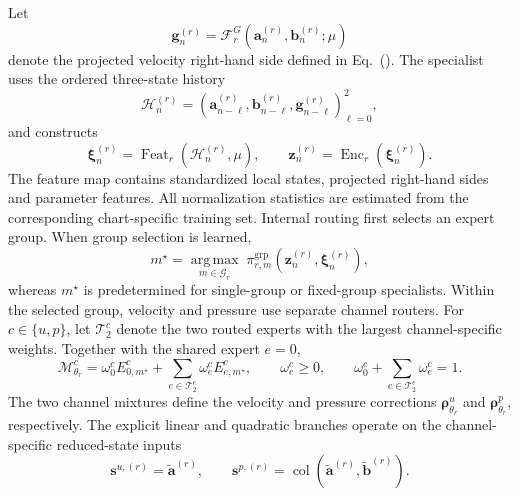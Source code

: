 Let
\begin{equation}
  \bm g_n^{(r)}
  =
  \mathcal F_r^G
  \left(
    \bm a_n^{(r)},\bm b_n^{(r)};\mu
  \right)
  \label{eq:app_galerkin_feature}
\end{equation}
denote the projected velocity right-hand side defined in Eq.~(). The specialist uses the ordered three-state history
\begin{equation}
  \mathcal H_n^{(r)}
  =
  \left(
    \bm a_{n-\ell}^{(r)},
    \bm b_{n-\ell}^{(r)},
    \bm g_{n-\ell}^{(r)}
  \right)_{\ell=0}^{2},
  \label{eq:app_specialist_history}
\end{equation}
and constructs
\begin{equation}
  \bm\xi_n^{(r)}
  =
  \operatorname{Feat}_r
  \left(
    \mathcal H_n^{(r)},\mu
  \right),
  \qquad
  \bm z_n^{(r)}
  =
  \operatorname{Enc}_r
  \left(
    \bm\xi_n^{(r)}
  \right).
  \label{eq:app_specialist_features}
\end{equation}
The feature map contains standardized local states, projected
right-hand sides and parameter features. All normalization statistics are estimated from the corresponding chart-specific training set. Internal routing first selects an expert group. When group selection is learned,
\begin{equation}
  m^\star
  =
  \underset{m\in\mathcal G_r}{\operatorname{arg\,max}}
  \;
  \pi_{r,m}^{\mathrm{grp}}
  \left(
    \bm z_n^{(r)},\bm\xi_n^{(r)}
  \right),
  \label{eq:app_group_top1}
\end{equation}
whereas $m^\star$ is predetermined for single-group or fixed-group
specialists. Within the selected group, velocity and pressure use separate channel routers. For $c\in\{u,p\}$, let $\mathcal T_2^c$ denote the two routed experts with the largest channel-specific weights. Together with the shared expert $e=0$,
\begin{equation}
  \mathcal M_{\theta_r}^c
  =
  \omega_0^c
  E_{0,m^\star}^c
  +
  \sum_{e\in\mathcal T_2^c}
  \omega_e^c
  E_{e,m^\star}^c,
  \qquad
  \omega_e^c\ge0,
  \qquad
  \omega_0^c+\sum_{e\in\mathcal T_2^c}\omega_e^c=1.
  \label{eq:app_channel_sparse_moe}
\end{equation}
The two channel mixtures define the velocity and pressure corrections
$\bm\rho_{\theta_r}^u$ and $\bm\rho_{\theta_r}^p$, respectively. The explicit linear and quadratic branches operate on the channel-specific reduced-state inputs
\begin{equation}
  \bm s^{u,(r)}
  =
  \widetilde{\bm a}^{(r)},
  \qquad
  \bm s^{p,(r)}
  =
  \operatorname{col}
  \left(
    \widetilde{\bm a}^{(r)},
    \widetilde{\bm b}^{(r)}
  \right).
  \label{eq:app_expert_state_slices}
\end{equation}
